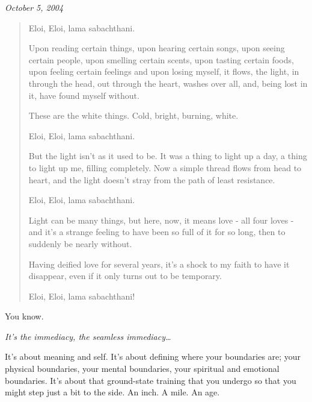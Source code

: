 \begin{rightcolumn*}
\begin{flushright}
    \emph{October 5, 2004}
\end{flushright}
\end{rightcolumn*}
\begin{leftcolumn}
\begin{quotation}
\noindent Eloi, Eloi, lama sabachthani.

Upon reading certain things, upon hearing certain songs, upon seeing certain people, upon smelling certain scents, upon tasting certain foods, upon feeling certain feelings and upon losing myself, it flows, the light, in through the head, out through the heart, washes over all, and, being lost in it, have found myself without.


\noindent These are the white things. Cold, bright, burning, white.

Eloi, Eloi, lama sabachthani.

But the light isn't as it used to be. It was a thing to light up a day, a thing to light up me, filling completely. Now a simple thread flows from head to heart, and the light doesn't stray from the path of least resistance.


\noindent Eloi, Eloi, lama sabachthani.

Light can be many things, but here, now, it means love - all four loves - and it's a strange feeling to have been so full of it for so long, then to suddenly be nearly without.


\noindent Having deified love for several years, it's a shock to my faith to have it disappear, even if it only turns out to be temporary.


\noindent Eloi, Eloi, lama sabachthani!
\end{quotation}
\newpage


\noindent You know.


\emph{It's the immediacy, the seamless immediacy\ldots{}}

\noindent It's about meaning and self. It's about defining where your boundaries are; your physical boundaries, your mental boundaries, your spiritual and emotional boundaries. It's about that ground-state training that you undergo so that you might step just a bit to the side. An inch. A mile. An age.


\end{leftcolumn}
